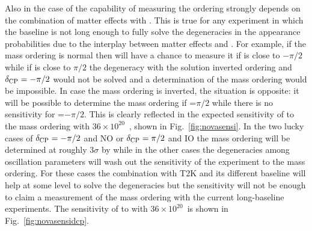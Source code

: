 %
%
Also in the case of \nova the capability of measuring the ordering strongly depends on the combination of matter effects with \dcp. This is true for any experiment in which the baseline is not long enough to fully solve the degeneracies in the appearance probabilities due to the interplay between matter effects and \dcp. 
For example, if the mass ordering is normal then \nova will have a chance to measure it if \dcp is close to $-\pi/2$ while if \dcp is close to $\pi/2$ the degeneracy with the solution inverted ordering and $\delta_{\mathrm{CP}}=-\pi/2$ would not be solved and a determination of the mass ordering would be impossible. In case the mass ordering is inverted, the situation is opposite: it will be possible to determine the mass ordering if \dcp=$\pi/2$ while there is no sensitivity for \dcp=$-\pi/2$. This is clearly reflected in the expected sensitivity of \nova to the mass ordering with $36\times10^{20}$~\pot, shown in Fig.~\ref{fig:novasensi}.
In the two lucky cases of $\delta_{\mathrm{CP}}=-\pi/2$ and NO or $\delta_{\mathrm{CP}}=\pi/2$ and IO the mass ordering will be determined at roughly $3\sigma$ by \nova while in the other cases the degeneracies among oscillation parameters will wash out the sensitivity of the experiment to the mass ordering. For these cases the combination with T2K and its different baseline will help at some level to solve the degeneracies but the sensitivity will not be enough to claim a measurement of the mass ordering with the current long-baseline experiments. The sensitivity of \nova to \dcp with  $36\times10^{20}$~\pot is shown in Fig.~\ref{fig:novasensidcp}.


